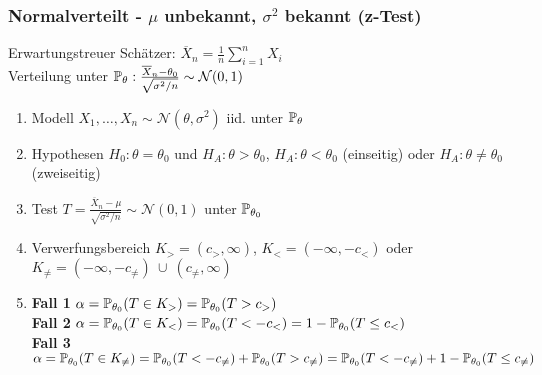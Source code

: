 \subsubsection*{\texorpdfstring{Normalverteilt - \(\mu\) unbekannt, \(\sigma^2\) bekannt (z-Test)}{Normalverteilt - μ unbekannt, σ² bekannt (z-Test)}}
Erwartungstreuer Schätzer: \(\overline{X}_n = \frac{1}{n} \sum_{i=1}^n X_i\)\\
Verteilung unter \(\P_\theta: \frac{\overline{X}_n - \theta_0}{\sqrt{\sigma^2/n}} \sim \mathcal{N}(0,1)\)
\begin{enumerate}
	\item Modell \(X_1, \ldots, X_n \sim \mathcal{N}(\theta, \sigma^2)\) iid. unter \(\P_\theta\)
	\item Hypothesen \(H_0 : \theta = \theta_0\) und \(H_A : \theta > \theta_0\), \(H_A : \theta < \theta_0\) (einseitig) oder \(H_A : \theta \ne \theta_0\) (zweiseitig)
	\item Test \(T = \frac{\overline{X}_n - \mu}{\sqrt{\sigma^2/n}} \sim \mathcal{N}(0,1)\) unter \(\P_{\theta_0}\)
	\item Verwerfungsbereich \(K_{>} = (c_{>}, \infty)\), \(K_{<} = (-\infty, -c_{<})\) oder \(K_{\neq} = (-\infty, -c_{\neq}) \ \cup \ (c_{\neq}, \infty)\)
	\item \textbf{Fall 1} \(\alpha = \P_{\theta_0}(T \in K_>) = \P_{\theta_0}(T > c_>)\)\\
	\textbf{Fall 2} \(\alpha = \P_{\theta_0}(T \in K_<) = \P_{\theta_0}(T < -c_<) = 1 - \P_{\theta_0}(T \leq c_<)\)\\
	\textbf{Fall 3} \(\alpha = \P_{\theta_0}(T \in K_{\neq}) = \P_{\theta_0}(T < -c_{\neq}) + \P_{\theta_0}(T > c_{\neq}) = \P_{\theta_0}(T < -c_{\neq}) + 1 - \P_{\theta_0}(T \leq c_{\neq})\)
\end{enumerate}


